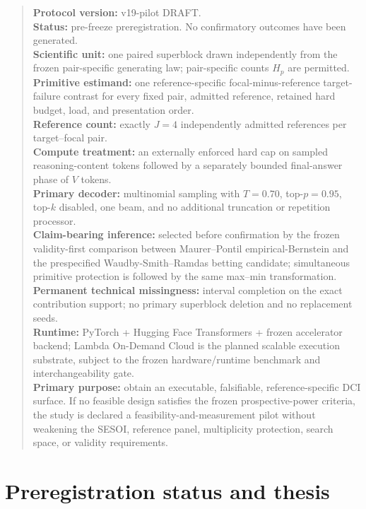 \documentclass[11pt,a4paper]{article}
\begin{document}
\begin{quote}
\textbf{Protocol version:} v19-pilot DRAFT.\\
\textbf{Status:} pre-freeze preregistration. No confirmatory outcomes have been generated.\\
\textbf{Scientific unit:} one paired superblock drawn independently from the frozen pair-specific generating law; pair-specific counts $H_p$ are permitted.\\
\textbf{Primitive estimand:} one reference-specific focal-minus-reference target-failure contrast for every fixed pair, admitted reference, retained hard budget, load, and presentation order.\\
\textbf{Reference count:} exactly $J=4$ independently admitted references per target--focal pair.\\
\textbf{Compute treatment:} an externally enforced hard cap on sampled reasoning-content tokens followed by a separately bounded final-answer phase of $V$ tokens.\\
\textbf{Primary decoder:} multinomial sampling with $T=0.70$, top-$p=0.95$, top-$k$ disabled, one beam, and no additional truncation or repetition processor.\\
\textbf{Claim-bearing inference:} selected before confirmation by the frozen validity-first comparison between Maurer--Pontil empirical-Bernstein and the prespecified Waudby-Smith--Ramdas betting candidate; simultaneous primitive protection is followed by the same max--min transformation.\\
\textbf{Permanent technical missingness:} interval completion on the exact contribution support; no primary superblock deletion and no replacement seeds.\\
\textbf{Runtime:} PyTorch + Hugging Face Transformers + frozen accelerator backend; Lambda On-Demand Cloud is the planned scalable execution substrate, subject to the frozen hardware/runtime benchmark and interchangeability gate.\\
\textbf{Primary purpose:} obtain an executable, falsifiable, reference-specific DCI surface. If no feasible design satisfies the frozen prospective-power criteria, the study is declared a feasibility-and-measurement pilot without weakening the SESOI, reference panel, multiplicity protection, search space, or validity requirements.
\end{quote}

\section{Preregistration status and thesis}
\end{document}
